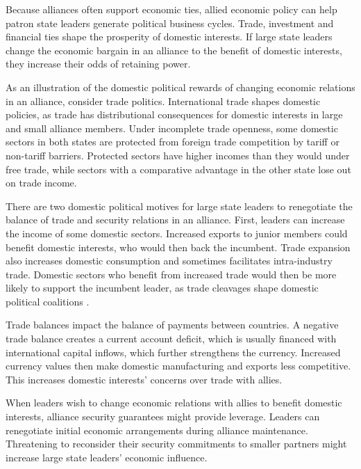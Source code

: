 \documentclass[12pt]{article}
\begin{document}
Because alliances often support economic ties, allied economic policy can help patron state leaders generate political business cycles. 
Trade, investment and financial ties shape the prosperity of domestic interests.
If large state leaders change the economic bargain in an alliance to the benefit of domestic interests, they increase their odds of retaining power. 


As an illustration of the domestic political rewards of changing economic relations in an alliance, consider trade politics.
International trade shapes domestic policies, as trade has distributional consequences for domestic interests in large and small alliance members.
Under incomplete trade openness, some domestic sectors in both states are protected from foreign trade competition by tariff or non-tariff barriers. 
Protected sectors have higher incomes than they would under free trade, while sectors with a comparative advantage in the other state lose out on trade income. 


There are two domestic political motives for large state leaders to renegotiate the balance of trade and security relations in an alliance. 
First, leaders can increase the income of some domestic sectors.
Increased exports to junior members could benefit domestic interests, who would then back the incumbent. 
Trade expansion also increases domestic consumption and sometimes facilitates intra-industry trade.
Domestic sectors who benefit from increased trade would then be more likely to support the incumbent leader, as trade cleavages shape domestic political coalitions \citep{Rogowski1987, Hiscox2001}. 
 

Trade balances impact the balance of payments between countries.
A negative trade balance creates a current account deficit, which is usually financed with international capital inflows, which further strengthens the currency. 
Increased currency values then make domestic manufacturing and exports less competitive. 
This increases domestic interests' concerns over trade with allies. 


When leaders wish to change economic relations with allies to benefit domestic interests, alliance security guarantees might provide leverage. 
Leaders can renegotiate initial economic arrangements during alliance maintenance. 
Threatening to reconsider their security commitments to smaller partners might increase large state leaders' economic influence. 
\end{document}
